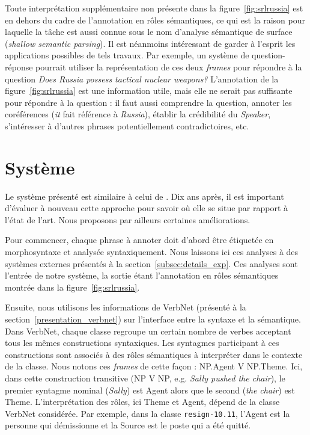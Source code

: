 Toute interprétation supplémentaire non présente dans la
figure~\ref{fig:srlrussia} est en dehors du cadre de l'annotation en rôles
sémantiques, ce qui est la raison pour laquelle la tâche est aussi connue sous
le nom d'analyse sémantique de surface (\emph{shallow semantic parsing}).  Il
est néanmoins intéressant de garder à l'esprit les applications possibles de
tels travaux. Par exemple, un système de question-réponse pourrait utiliser la
représentation de ces deux \emph{frames} pour répondre à la question \emph{Does
Russia possess tactical nuclear weapons?} L'annotation de la
figure~\ref{fig:srlrussia} est une information utile, mais elle ne serait pas
suffisante pour répondre à la question : il faut aussi comprendre la question,
annoter les coréférences (\emph{it} fait référence à \emph{Russia}), établir la
crédibilité du \emph{Speaker}, s'intéresser à d'autres phrases potentiellement
contradictoires, etc.

\section{Système}

Le système présenté est similaire à celui de
\cite{swier2004unsupervised,swier2005exploiting}. Dix ans après, il est
important d'évaluer à nouveau cette approche pour savoir où elle se situe par
rapport à l'état de l'art. Nous proposons par ailleurs certaines améliorations.

Pour commencer, chaque phrase à annoter doit d'abord être étiquetée en
morphosyntaxe et analysée syntaxiquement. Nous laissons ici ces analyses à des
systèmes externes présentés à la section~\ref{subsec:details_exp}. Ces analyses
sont l'entrée de notre système, la sortie étant l'annotation en rôles
sémantiques montrée dans la figure~\ref{fig:srlrussia}.

Ensuite, nous utilisons les informations de VerbNet (présenté à la
section~\ref{presentation_verbnet}) sur l'interface entre la syntaxe et la
sémantique. Dans VerbNet, chaque classe regroupe un certain nombre de verbes
acceptant tous les mêmes constructions syntaxiques. Les syntagmes participant à
ces constructions sont associés à des rôles sémantiques à interpréter dans le
contexte de la classe. Nous notons ces \emph{frames} de cette façon : NP.Agent
V NP.Theme. Ici, dans cette construction transitive (NP V NP, e.g. \emph{Sally
pushed the chair}), le premier syntagme nominal (\emph{Sally}) est Agent alors
que le second (\emph{the chair}) est Theme. L'interprétation des rôles, ici
Theme et Agent, dépend de la classe VerbNet considérée. Par exemple, dans la
classe \texttt{resign-10.11}, l'Agent est la personne qui démissionne et la
Source est le poste qui a été quitté.


